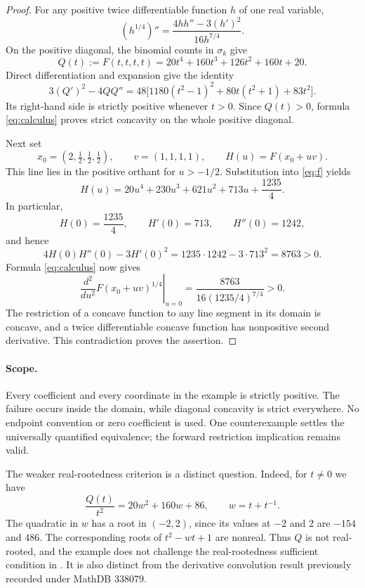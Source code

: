 \documentclass[11pt]{article}
\begin{document}
\begin{proof}
For any positive twice differentiable function $h$ of one real variable,
\begin{equation}\label{eq:calculus}
 (h^{1/4})''=\frac{4hh''-3(h')^2}{16h^{7/4}}.
\end{equation}
On the positive diagonal, the binomial counts in $\sigma_k$ give
\[
 Q(t):=F(t,t,t,t)=20t^4+160t^3+126t^2+160t+20.
\]
Direct differentiation and expansion give the identity
\begin{equation}\label{eq:diagonal}
 3(Q')^2-4QQ''
 =48\bigl[1180(t^2-1)^2+80t(t^2+1)+83t^2\bigr].
\end{equation}
Its right-hand side is strictly positive whenever $t>0$.
Since $Q(t)>0$, formula \eqref{eq:calculus} proves strict concavity
on the whole positive diagonal.

Next set
\[
 x_0=(2,\tfrac12,\tfrac12,\tfrac12),\qquad v=(1,1,1,1),
 \qquad H(u)=F(x_0+uv).
\]
This line lies in the positive orthant for $u>-1/2$.
Substitution into \eqref{eq:f} yields
\begin{equation}\label{eq:line}
 H(u)=20u^4+230u^3+621u^2+713u+\frac{1235}{4}.
\end{equation}
In particular,
\[
 H(0)=\frac{1235}{4},\qquad H'(0)=713,\qquad H''(0)=1242,
\]
and hence
\begin{equation}\label{eq:witness}
 4H(0)H''(0)-3H'(0)^2
 =1235\cdot1242-3\cdot713^2=8763>0.
\end{equation}
Formula \eqref{eq:calculus} now gives
\[
 \left.\frac{d^2}{du^2}F(x_0+uv)^{1/4}\right|_{u=0}
 =\frac{8763}{16(1235/4)^{7/4}}>0.
\]
The restriction of a concave function to any line segment in its domain
is concave, and a twice differentiable concave function has nonpositive
second derivative. This contradiction proves the assertion.
\end{proof}

\paragraph{Scope.}
Every coefficient and every coordinate in the example is strictly
positive. The failure occurs inside the domain, while diagonal concavity
is strict everywhere. No endpoint convention or zero coefficient is used.
One counterexample settles the universally quantified equivalence;
the forward restriction implication remains valid.

The weaker real-rootedness criterion is a distinct question. Indeed,
for $t\ne0$ we have
\[
 \frac{Q(t)}{t^2}=20w^2+160w+86,\qquad w=t+t^{-1}.
\]
The quadratic in $w$ has a root in $(-2,2)$, since its values at $-2$
and $2$ are $-154$ and $486$. The corresponding roots of
$t^2-wt+1$ are nonreal. Thus $Q$ is not real-rooted, and the example
does not challenge the real-rootedness sufficient condition in
\cite[Theorem 2.7(d)]{Gravity}. It is also distinct from the derivative
convolution result previously recorded under MathDB 338079.
\end{document}
